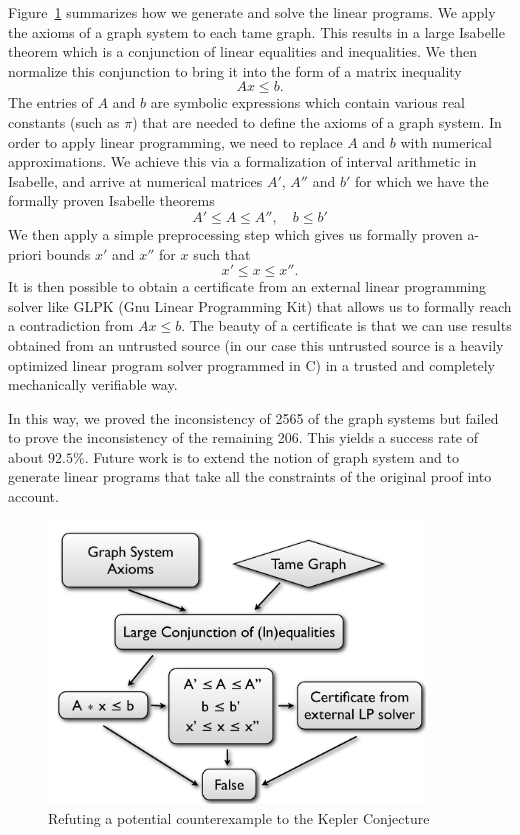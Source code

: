 \documentclass[11pt]{amsart}
\begin{document}
Figure~\ref{fig:lpapproach} summarizes how we generate and solve the linear programs.
We apply the axioms of a graph system to each tame graph. This results in a large Isabelle theorem which is a conjunction of
linear equalities and inequalities. We then normalize this conjunction
to bring it into the form of a matrix inequality
\begin{equation}
A  x \leq b.
\end{equation}
The entries of $A$ and $b$ are symbolic expressions which contain various real constants (such as $\pi$) that are needed to
define the axioms of a graph system. In order to apply linear programming, 
we need to replace $A$ and $b$ with numerical approximations. We achieve this via a formalization of 
interval arithmetic in Isabelle, and arrive at numerical matrices $A'$, $A''$ and $b'$ for which we have the formally proven 
Isabelle theorems 
\begin{equation}
A' \leq  A  \leq A'', \quad b \leq b'
\end{equation}
We then apply a simple preprocessing step which gives us formally proven a-priori bounds $x'$ and $x''$ for $x$ such
that 
\begin{equation}
x' \leq x \leq x''.
\end{equation}
It is then possible to obtain a certificate from an external linear programming solver like GLPK (Gnu Linear Programming Kit) that allows us to formally reach a contradiction from $A x \leq b$. The beauty of a certificate is 
that we can use results obtained from an untrusted source (in our case this untrusted source is a 
heavily optimized linear program solver programmed in C) in a trusted and completely mechanically verifiable way.

In this way, we proved the inconsistency of 2565 of the graph systems but failed to prove the inconsistency of the remaining 206. 
This yields a success rate of about $92.5\%$. Future work is to extend the notion of graph system and to generate linear programs
that take all the constraints of the original proof into account.


\begin{figure}
\caption{Refuting a potential counterexample to the Kepler Conjecture}
\label{fig:lpapproach}
\begin{center}
\includegraphics[width=10cm]{lpapproach}
\end{center}
\end{figure}
\end{document}
